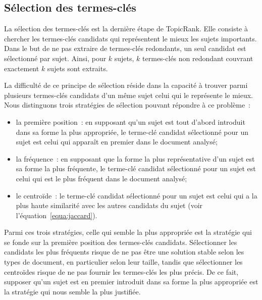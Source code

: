   \subsection{Sélection des termes-clés}
  \label{subsec:selection_des_termes_cles}
    La sélection des termes-clés est la dernière étape de TopicRank. Elle
    consiste à chercher les termes-clés candidats qui représentent le mieux les
    sujets importants. Dans le but de ne pas extraire de termes-clés redondants,
    un seul candidat est sélectionné par sujet.
    Ainsi, pour $k$ sujets, $k$ termes-clés non redondant couvrant exactement
    $k$ sujets sont extraits.

    La difficulté de ce principe de sélection réside dans la capacité à trouver
    parmi plusieurs termes-clés candidats d'un même sujet celui qui le
    représente le mieux. Nous distinguons trois stratégies de sélection pouvant
    répondre à ce problème~:
    \begin{itemize}
      \item{la première position~: en supposant qu'un sujet est tout d'abord
            introduit dans sa forme la plus appropriée, le terme-clé candidat
            sélectionné pour un sujet est celui qui apparaît en premier dans le
            document analysé;}
      \item{la fréquence~: en supposant que la forme la plus représentative d'un
            sujet est sa forme la plus fréquente, le terme-clé candidat
            sélectionné pour un sujet est celui qui est le plus fréquent dans le
            document analysé;}
      \item{le centroïde~: le terme-clé candidat sélectionné pour un sujet est
            celui qui a la plus haute similarité avec les autres candidats du
            sujet (voir l'équation~\ref{equa:jaccard}).}
    \end{itemize}
    Parmi ces trois stratégies, celle qui semble la plus appropriée est la
    stratégie qui se fonde sur la première position des termes-clés candidats.
    Sélectionner les candidats les plus fréquents risque de ne pas être une
    solution stable selon les types de document, en particulier selon leur
    taille, tandis que sélectionner les centroïdes risque de ne pas fournir les
    termes-clés les plus précis. De ce fait, supposer qu'un sujet est en premier
    introduit dans sa forme la plus appropriée est la stratégie qui nous semble
    la plus justifiée.

